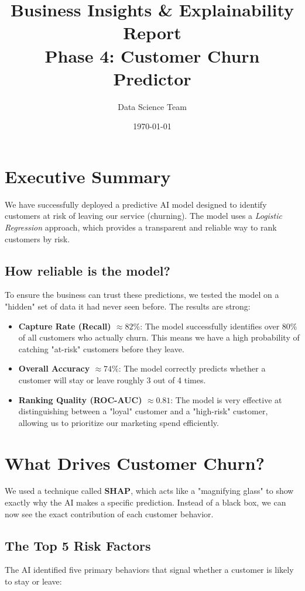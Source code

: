 \documentclass[11pt,a4paper]{article}
\title{
    \vspace{-2cm}
    \huge \textbf{Business Insights \& Explainability Report} \\
    \vspace{0.5cm}
    \large Phase 4: Customer Churn Predictor
}
\author{Data Science Team}
\date{\today}
\begin{document}
\maketitle

\section{Executive Summary}

We have successfully deployed a predictive AI model designed to identify customers at risk of leaving our service (churning). The model uses a \textit{Logistic Regression} approach, which provides a transparent and reliable way to rank customers by risk.

\subsection{How reliable is the model?}
To ensure the business can trust these predictions, we tested the model on a "hidden" set of data it had never seen before. The results are strong:
\begin{itemize}
    \item \textbf{Capture Rate (Recall) $\approx 82\%$}: The model successfully identifies over 80\% of all customers who actually churn. This means we have a high probability of catching "at-risk" customers before they leave.
    \item \textbf{Overall Accuracy $\approx 74\%$}: The model correctly predicts whether a customer will stay or leave roughly 3 out of 4 times.
    \item \textbf{Ranking Quality (ROC-AUC) $\approx 0.81$}: The model is very effective at distinguishing between a "loyal" customer and a "high-risk" customer, allowing us to prioritize our marketing spend efficiently.
\end{itemize}

\section{What Drives Customer Churn?}

We used a technique called \textbf{SHAP}, which acts like a "magnifying glass" to show exactly why the AI makes a specific prediction. Instead of a black box, we can now see the exact contribution of each customer behavior.

\subsection{The Top 5 Risk Factors}
The AI identified five primary behaviors that signal whether a customer is likely to stay or leave:
\end{document}
